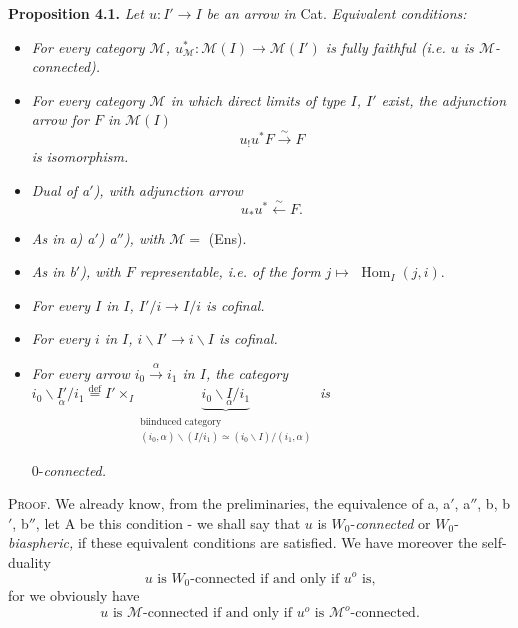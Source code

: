 \documentclass[11pt]{article}
\newcommand{\msp}[1]{\marginpar{\footnotesize [#1]}}
\newcommand{\Hom}{\operatorname{Hom}}
\newcommand{\bs}{\backslash}
\newcommand{\cM}{\mathcal{M}}
\newcommand{\defeq}{\overset{\text{def}}{=}}
\begin{document}
\noindent\textbf{Proposition 4.1.} \textit{Let $u : I' \longrightarrow I$ be an arrow in} Cat. \textit{Equivalent conditions:}
\begin{itemize}[label={}]
\item[\textit{a)}] \textit{For every category $\cM$, $u^*_{\cM} : \cM(I) \longrightarrow \cM(I')$ is fully faithful (i.e. $u$ is $\cM$-connected).}
\item[\textit{a$'$)}] \textit{For every category $\cM$ in which direct limits of type $I$, $I'$ exist, the adjunction arrow for $F$ in $\cM(I)$} %
\[
u_!u^*F \xrightarrow{\sim} F
\]
\textit{is} \textit{isomorphism.}
\item[\textit{a$''$)}] \textit{Dual of a$'$), with} \textit{adjunction arrow}
\[
u_*u^* \xleftarrow{\sim} F. %
\]
\item[\textit{b) b$'$) b$''$)}] \textit{As in a) a$'$) a$''$), with $\cM =$} (Ens).
\item[\textit{c)}] \textit{As in b$'$), with $F$ representable, i.e. of the form $j \longmapsto$} $\Hom_I(j, i)$.
\item[\textit{d)}] \textit{For every $I$ in $I$, $I'/i \longrightarrow I/i$ is cofinal.} %
\item[\textit{d$'$)}] \textit{For every $i$ in $I$, $i\bs I' \longrightarrow i\bs I$ is cofinal.}
\item[\textit{d$''$)}] \textit{For every arrow $i_0 \xrightarrow{\alpha} i_1$ in $I$, the category} $i_0\bs \underset{\alpha}{I'}/i_1 \defeq I' \times_I \underbrace{i_0\bs \underset{\alpha}{I}/i_1}_{\substack{\text{biinduced category}\\ (i_0, \alpha)\bs(I/i_1) \simeq (i_0\bs I)/(i_1, \alpha)}}$ \qquad \textit{is}

0-\textit{connected.}
\end{itemize}

\msp{page 53}
\textsc{Proof.} We already know, from the preliminaries, the equivalence of a, a$'$, a$''$, b, b$'$, b$''$, let A be this condition - we shall say that $u$ is $W_0$-\textit{connected} or $W_0$-\textit{biaspheric,} if these equivalent conditions are satisfied. We have moreover the self-duality
\[
\text{$u$ is $W_0$-connected if and only if $u^o$ is,}
\tag*{(4.8)} %
\]
for we obviously have
\[
\text{$u$ is $\cM$-connected if and only if $u^o$ is $\cM^o$-connected.}
\tag*{(4.9)}
\]
\end{document}
